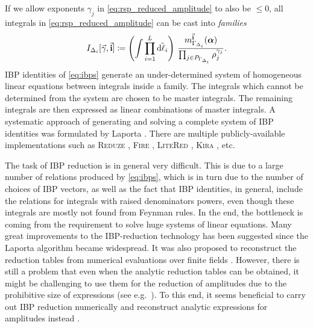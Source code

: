 If we allow exponents $\gamma_j$ in \cref{eq:rsp_reduced_amplitude} to also be $\leq0$,
all integrals in \cref{eq:rsp_reduced_amplitude} can be cast into \emph{families}
\begin{equation} \label{eq:integral_families}
    I_{\Delta_i}[\va{\gamma},\va{i}] \coloneqq 
  \qty(\int \prod_{i=1}^{L} \tilde{\dd{\ell_i}}) ~  
  \frac{m^{\va{i}}_{\Gamma_{\Delta_i}}(\vb*{\alpha})%
    }{\prod_{j\in P_{\Gamma_{\Delta_i}}} \rho_j^{\gamma_{j}}}.
\end{equation}
IBP identities of \cref{eq:ibps} generate an under-determined system of homogeneous linear equations between integrals inside a family.
The integrals which cannot be determined from the system are chosen to be master integrals.
The remaining integrals are then expressed as linear combinations of master integrals.
A systematic approach of generating and solving a complete system of IBP identities was formulated by Laporta \cite{Laporta:2001dd}.
There are multiple publicly-available implementations such as
\textsc{Reduze} \cite{Studerus:2009ye,vonManteuffel:2012np},
\textsc{Fire} \cite{Smirnov:2008iw,Smirnov:2014hma},
\textsc{LiteRed} \cite{Lee:2012cn,Lee:2013mka},
\textsc{Kira} \cite{Maierhoefer:2017hyi,Maierhofer:2018gpa}, etc.

The task of IBP reduction is in general very difficult.
This is due to a large number of relations produced by \cref{eq:ibps},
which is in turn due to the number of choices of IBP vectors, as well as the fact that IBP identities,
in general, include the relations for integrals with raised denominators powers, even
though these integrals are mostly not found from Feynman rules.
In the end, the bottleneck is coming from the requirement to solve huge systems of linear equations.
Many great improvements to the IBP-reduction technology has been suggested
\cite{Gluza:2010ws,Schabinger:2011dz,Larsen:2015ped,Bern:2017gdk,Chawdhry:2018awn,Kosower:2018obg,Mastrolia:2018uzb,Frellesvig:2019kgj,Frellesvig:2019uqt,Bendle2019}
since the Laporta algorithm became widespread.
It was also proposed to reconstruct the reduction tables from
numerical evaluations over finite fields \cite{vonManteuffel:2014ixa,Peraro:2016wsq,Peraro:2019svx,Klappert:2019emp,Smirnov:2019qkx}.
However, there is still a problem
that even when the analytic reduction tables can be obtained,
it might be challenging to use them for the reduction of amplitudes due
to the prohibitive size of expressions (see e.g.\ \cite{Chawdhry:2018awn,Bendle2019}).
To this end, it seems beneficial to carry out IBP reduction numerically and reconstruct
analytic expressions for amplitudes instead \cite{Badger:2018enw,Chicherin:2018yne,Badger:2019djh}.

